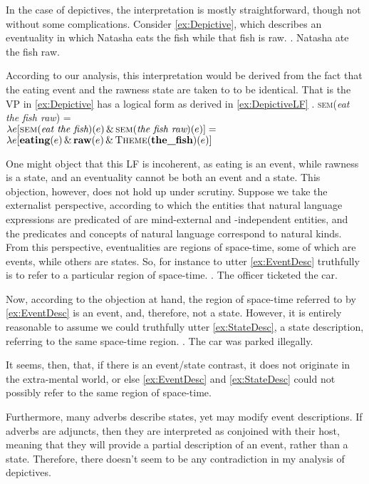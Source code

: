 \documentclass[MilwayThesis]{subfiles}
\begin{document}
In the case of depictives, the interpretation is mostly straightforward, though not without some complications.
Consider \cref{ex:Depictive}, which describes an eventuality in which Natasha eats the fish while that fish is raw.
\ex. Natasha ate the fish raw.\label{ex:Depictive}

According to our analysis, this interpretation would be derived from the fact that the eating event and the rawness state are taken to to be identical.
That is the VP in \cref{ex:Depictive} has a logical form  as derived in \cref{ex:DepictiveLF}
\ex. \textsc{sem}(\textit{eat the fish raw}) =\\
$\lambda e [\textsc{sem}(\textit{eat the fish})(e) \, \&\, \textsc{sem}(\textit{the fish raw})(e)] =$\\
$\lambda e [\textbf{eating}(e)\, \&\, \textbf{raw}(e)\, \&\, \textsc{Theme}(\textbf{the\_fish})(e)]$\label{ex:DepictiveLF}

One might object that this LF is incoherent, as eating is an event, while rawness is a state, and an eventuality cannot be both an event and a state.
This objection, however, does not hold up under scrutiny.
Suppose we take the externalist perspective, according to which the entities that natural language expressions are predicated of are mind-external and -independent entities, and the predicates and concepts of natural language correspond to natural kinds.
From this perspective, eventualities are regions of space-time, some of which are events, while others are states.
So, for instance to utter \cref{ex:EventDesc} truthfully is to refer to a particular region of space-time.
\ex.\label{ex:EventDesc} The officer ticketed the car.

Now, according to the objection at hand, the region of space-time referred to by \cref{ex:EventDesc} is an event, and, therefore, not a state.
However, it is entirely reasonable to assume we could truthfully utter \cref{ex:StateDesc}, a state description, referring to the same space-time region.
\ex.\label{ex:StateDesc} The car was parked illegally.

It seems, then, that, if there is an event/state contrast, it does not originate in the extra-mental world, or else \cref{ex:EventDesc} and \cref{ex:StateDesc} could not possibly refer to the same region of space-time.

Furthermore, many adverbs describe states, yet may modify event descriptions.
If adverbs are adjuncts, then they are interpreted as conjoined with their host, meaning that they will provide a partial description of an event, rather than a state.
Therefore, there doesn't seem to be any contradiction in my analysis of depictives.
\end{document}
